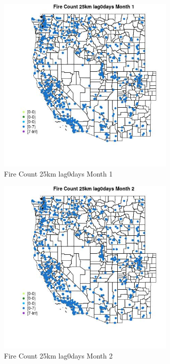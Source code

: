 \begin{figure} 
\centering  
\includegraphics[width=0.77\textwidth]{Code_Outputs/Report_ML_input_PM25_Step4_part_e_de_duplicated_aves_compiled_2019-05-21wNAs_MapObsMo1Fire_Count_25km_lag0days.jpg} 
\caption{\label{fig:Report_ML_input_PM25_Step4_part_e_de_duplicated_aves_compiled_2019-05-21wNAsMapObsMo1Fire_Count_25km_lag0days}Fire Count 25km lag0days Month 1} 
\end{figure} 
 

\begin{figure} 
\centering  
\includegraphics[width=0.77\textwidth]{Code_Outputs/Report_ML_input_PM25_Step4_part_e_de_duplicated_aves_compiled_2019-05-21wNAs_MapObsMo2Fire_Count_25km_lag0days.jpg} 
\caption{\label{fig:Report_ML_input_PM25_Step4_part_e_de_duplicated_aves_compiled_2019-05-21wNAsMapObsMo2Fire_Count_25km_lag0days}Fire Count 25km lag0days Month 2} 
\end{figure} 
 

